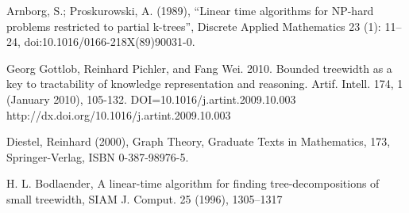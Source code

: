 \documentclass[12pt]{article}
\begin{document}
 Arnborg, S.; Proskurowski, A. (1989), 
``Linear time algorithms for NP-hard problems restricted to partial k-trees'',
Discrete Applied Mathematics 23 (1): 11–24, doi:10.1016/0166-218X(89)90031-0.

Georg Gottlob, Reinhard Pichler, and Fang Wei. 2010. Bounded treewidth as a key to tractability of knowledge representation and reasoning. Artif. Intell. 174, 1 (January 2010), 105-132. DOI=10.1016/j.artint.2009.10.003 http://dx.doi.org/10.1016/j.artint.2009.10.003

Diestel, Reinhard (2000), Graph Theory, Graduate Texts in Mathematics, 
173, Springer-Verlag, ISBN 0-387-98976-5.

H. L. Bodlaender, A linear-time algorithm for finding 
tree-decompositions of small
treewidth, SIAM J. Comput. 25 (1996), 1305–1317


\endthebibliography
\end{document}
